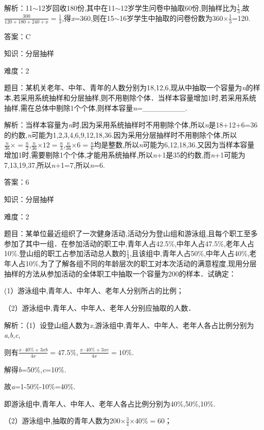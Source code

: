 \documentclass{article} %
\begin{document}
解析：11$\sim$12岁回收180份,其中在11$\sim$12岁学生问卷中抽取60份,则抽样比为$\frac{1}{3}$,故$\frac{300}{120+180+240+x}=\frac{1}{3}$,得\textit{x}=360,则在15$\sim$16岁学生中抽取的问卷份数为360$\mathrm{\times}\frac{1}{3}$=120.

答案：C

知识：分层抽样

难度：2

题目：某机关老年、中年、青年的人数分别为18,12,6,现从中抽取一个容量为\textit{n}的样本,若采用系统抽样和分层抽样,则不用剔除个体．当样本容量增加1时,若采用系统抽样,需在总体中剔除1个个体,则样本容量\textit{n}=\_\_\_\_\_\_\_\_.

解析：当样本容量为\textit{n}时,因为采用系统抽样时不用剔除个体,所以\textit{n}是18+12+6=36的约数,\textit{n}可能为1,2,3,4,6,9,12,18,36.因为采用分层抽样时不用剔除个体,所以$\frac{n}{36}\mathrm{\times}=\frac{n}{2}$,$\frac{n}{36}\mathrm{\times}12=\frac{n}{3}$,$\frac{n}{36}\mathrm{\times}6=\frac{n}{6}$均是整数,所以\textit{n}可能为6,12,18,36.又因为当样本容量增加1时,需要剔除1个个体,才能用系统抽样,所以\textit{n}+1是35的约数,而\textit{n}+1可能为7,13,19,37,所以\textit{n}+1=7,所以\textit{n}=6.

答案：6

知识：分层抽样

难度：2

题目：某单位最近组织了一次健身活动,活动分为登山组和游泳组,且每个职工至多参加了其中一组．在参加活动的职工中,青年人占42.5\%,中年人占47.5\%,老年人占10\%.登山组的职工占参加活动总人数的$\frac{1}{4}$,且该组中,青年人占50\%,中年人占40\%,老年人占10\%,为了了解各组不同的年龄层次的职工对本次活动的满意程度,现用分层抽样的方法从参加活动的全体职工中抽取一个容量为200的样本．试确定：

(1）游泳组中,青年人、中年人、老年人分别所占的比例；

（2）游泳组中,青年人、中年人、老年人分别应抽取的人数．

解析：（1）设登山组人数为\textit{x},游泳组中,青年人、中年人、老年人各占比例分别为\textit{a},\textit{b},\textit{c},

则有$\frac{x\cdot40\%+3xb}{4x}=47.5\%,\frac{x\cdot40\%+3xc}{4x}=10\%$.

解得\textit{b}=50\%,\textit{c}=10\%.

故\textit{a}=1-50\%-10\%=40\%.

即游泳组中,青年人、中年人、老年人各占比例分别为40\%,50\%,10\%.

（2）游泳组中,抽取的青年人数为$200\mathrm{\times}\frac{3}{4}\mathrm{\times}40\%=60$；
\end{document}
